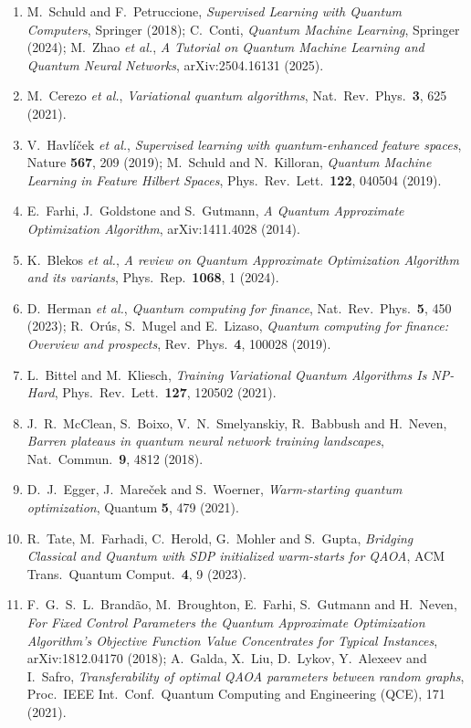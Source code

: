 \documentclass[12pt,a4paper]{article}
\begin{document}
\begin{enumerate}
    \item M.~Schuld and F.~Petruccione, \textit{Supervised Learning with Quantum Computers}, Springer (2018); C.~Conti, \textit{Quantum Machine Learning}, Springer (2024); M.~Zhao \textit{et al.}, \textit{A Tutorial on Quantum Machine Learning and Quantum Neural Networks}, arXiv:2504.16131 (2025).
    \item M.~Cerezo \textit{et al.}, \textit{Variational quantum algorithms}, Nat.\ Rev.\ Phys.\ \textbf{3}, 625 (2021).
    \item V.~Havl\'i\v{c}ek \textit{et al.}, \textit{Supervised learning with quantum-enhanced feature spaces}, Nature \textbf{567}, 209 (2019); M.~Schuld and N.~Killoran, \textit{Quantum Machine Learning in Feature Hilbert Spaces}, Phys.\ Rev.\ Lett.\ \textbf{122}, 040504 (2019).
    \item E.~Farhi, J.~Goldstone and S.~Gutmann, \textit{A Quantum Approximate Optimization Algorithm}, arXiv:1411.4028 (2014).
    \item K.~Blekos \textit{et al.}, \textit{A review on Quantum Approximate Optimization Algorithm and its variants}, Phys.\ Rep.\ \textbf{1068}, 1 (2024).
    \item D.~Herman \textit{et al.}, \textit{Quantum computing for finance}, Nat.\ Rev.\ Phys.\ \textbf{5}, 450 (2023); R.~Or\'us, S.~Mugel and E.~Lizaso, \textit{Quantum computing for finance: Overview and prospects}, Rev.\ Phys.\ \textbf{4}, 100028 (2019).
    \item L.~Bittel and M.~Kliesch, \textit{Training Variational Quantum Algorithms Is NP-Hard}, Phys.\ Rev.\ Lett.\ \textbf{127}, 120502 (2021).
    \item J.~R.~McClean, S.~Boixo, V.~N.~Smelyanskiy, R.~Babbush and H.~Neven, \textit{Barren plateaus in quantum neural network training landscapes}, Nat.\ Commun.\ \textbf{9}, 4812 (2018).
    \item D.~J.~Egger, J.~Mare\v{c}ek and S.~Woerner, \textit{Warm-starting quantum optimization}, Quantum \textbf{5}, 479 (2021).
    \item R.~Tate, M.~Farhadi, C.~Herold, G.~Mohler and S.~Gupta, \textit{Bridging Classical and Quantum with SDP initialized warm-starts for QAOA}, ACM Trans.\ Quantum Comput.\ \textbf{4}, 9 (2023).
    \item F.~G.~S.~L.~Brand\~ao, M.~Broughton, E.~Farhi, S.~Gutmann and H.~Neven, \textit{For Fixed Control Parameters the Quantum Approximate Optimization Algorithm's Objective Function Value Concentrates for Typical Instances}, arXiv:1812.04170 (2018); A.~Galda, X.~Liu, D.~Lykov, Y.~Alexeev and I.~Safro, \textit{Transferability of optimal QAOA parameters between random graphs}, Proc.\ IEEE Int.\ Conf.\ Quantum Computing and Engineering (QCE), 171 (2021).

\end{enumerate}
\end{document}
